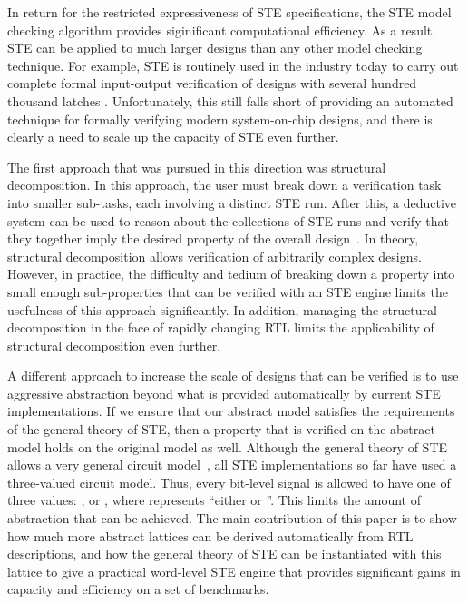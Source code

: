 \documentclass{llncs}
\begin{document}
In return for the restricted expressiveness of STE specifications, the
STE model checking algorithm provides siginificant computational
efficiency.  As a result, STE can be applied to much larger designs
than any other model checking technique.  For example, STE is
routinely used in the industry today to carry out complete formal
input-output verification of designs with several hundred thousand
latches \cite{KumarGuptaGhughal12,KaivolaEtAl09}.  Unfortunately, this
still falls short of providing an automated technique for formally
verifying modern system-on-chip designs, and there is clearly a need
to scale up the capacity of STE even further.

The first approach that was pursued in this direction was structural
decomposition.  In this approach, the user must break down a
verification task into smaller sub-tasks, each involving a distinct STE
run.  After this, a deductive system can be used to reason about the
collections of STE runs and verify that they together imply the
desired property of the overall design~\cite{JonesOSAM01}.
In theory, structural decomposition allows verification of arbitrarily
complex designs.  However, in practice, the difficulty and tedium of
breaking down a property into small enough sub-properties that can be
verified with an STE engine limits the usefulness of this approach
significantly.  In addition, managing the structural decomposition in
the face of rapidly changing RTL limits the applicability of
structural decomposition even further.

A different approach to increase the scale of designs that can be
verified is to use aggressive abstraction beyond what is provided
automatically by current STE implementations.  If we ensure that our
abstract model satisfies the requirements of the general theory of
STE, then a property that is verified on the abstract model holds on
the original model as well.  Although the general theory of STE allows
a very general circuit model~\cite{SegerBryant95}, all STE
implementations so far have used a three-valued circuit model.  Thus,
every bit-level signal is allowed to have one of three values: ,
 or , where  represents ``either  or ''.  This limits
the amount of abstraction that can be achieved.  The main contribution
of this paper is to show how much more abstract lattices can be
derived automatically from RTL descriptions, and how the general
theory of STE can be instantiated with this lattice to give a
practical word-level STE engine that provides significant gains in
capacity and efficiency on a set of benchmarks.
\end{document}
